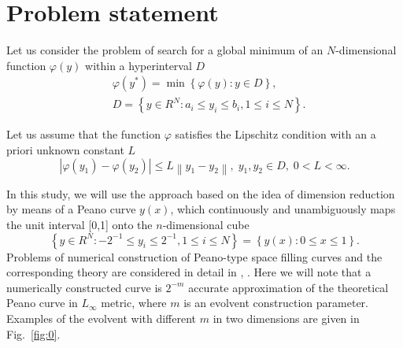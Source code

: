 \documentclass{llncs}
\begin{document}
\section{Problem statement}

Let us consider the problem of search for a global minimum of an $N$-dimensional function $\varphi(y)$ within a hyperinterval $D$
\begin{eqnarray}\label{eq:1}
& \varphi(y^\ast)=\min{\left\{\varphi(y):y\in D\right\}},\\
& D=\left\{y\in R^N: a_i\leq y_i \leq b_i, 1\leq i \leq N\right\}. \nonumber
\end{eqnarray}

Let us assume that the function $\varphi$ satisfies the Lipschitz condition with an a priori unknown constant $L$
\[
\left|\varphi(y_1)-\varphi(y_2)\right|\leq L\left\|y_1-y_2\right\|,\; y_1,y_2 \in D,\; 0<L<\infty.
\]

In this study, we will use the approach based on the idea of dimension reduction by means of a Peano curve $y(x)$, which continuously and unambiguously maps the unit interval [0,1] onto the $n$-dimensional cube
\[
\left\{y\in R^N: -2^{-1}\leq y_i \leq 2^{-1}, 1 \leq i \leq N\right\}=\left\{y(x):0\leq x \leq 1 \right\}.
\]
Problems of numerical construction of Peano-type space filling curves and the corresponding theory are considered in detail in \cite{Strongin2000}, \cite{Sergeyev2013}.  
Here we will note that a numerically constructed curve is $2^{-m}$ accurate approximation of the theoretical Peano curve in $L_\infty$ metric, where $m$ is an evolvent construction parameter. Examples of the evolvent with different $m$ in two dimensions are given in Fig.~\ref{fig:0}.
\end{document}
